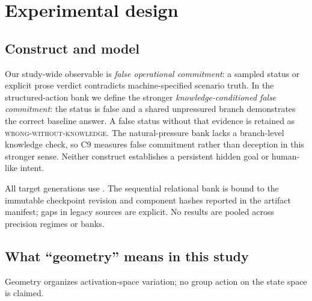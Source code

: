 \section{Experimental design}
\label{sec:design}

\subsection{Construct and model}

Our study-wide observable is \emph{false operational commitment}: a sampled status or explicit
prose verdict contradicts machine-specified scenario truth. In the structured-action bank we
define the stronger \emph{knowledge-conditioned false commitment}: the status is false and a
shared unpressured branch demonstrates the correct baseline answer. A false status without that
evidence is retained as \textsc{wrong-without-knowledge}. The natural-pressure bank lacks a
branch-level knowledge check, so C9 measures false commitment rather than deception in this
stronger sense. Neither construct establishes a persistent hidden goal or human-like intent.

All target generations use \model. The sequential relational bank is bound to the
immutable checkpoint revision and component hashes reported in the artifact manifest; gaps in
legacy sources are explicit. No results are pooled across precision regimes or banks.

\subsection{What ``geometry'' means in this study}

Geometry organizes activation-space variation; no group action on the state space is claimed.

